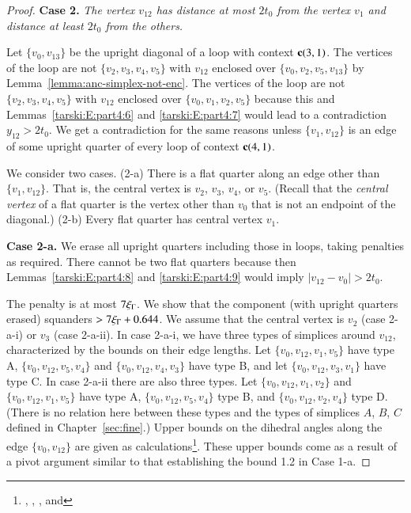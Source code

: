 \begin{proof}
\medskip

{\bf Case 2.} {\it The vertex $v_{12}$ has distance at most $2t_0$
from the vertex $v_1$ and distance at least $2t_0$ from the
others.}

Let $\{v_0,v_{13}\}$ be the upright diagonal of a loop with context ${\operatorname{\bf c}}{(3,1)}$.  The
vertices of the loop are not $\{v_2,v_3,v_4,v_5\}$ with $v_{12}$
enclosed over $\{v_0,v_2,v_5,v_{13}\}$ by
Lemma~\ref{lemma:anc-simplex-not-enc}. The vertices of the loop
are not $\{v_2,v_3,v_4,v_5\}$ with $v_{12}$ enclosed over
$\{v_0,v_1,v_2,v_5\}$ because this and Lemmas~\ref{tarski:E:part4:6}
and \ref{tarski:E:part4:7} would lead to a contradiction
$y_{12}>2t_0$. 
We get a contradiction for the same reasons
 unless $\{v_1,v_{12}\}$ is an edge of some
upright quarter of every loop of context ${\operatorname{\bf c}}{(4,1)}$.

We consider two cases.  (2-a) There is a flat quarter along an
edge other than $\{v_1,v_{12}\}$.  That is, the central vertex is
$v_2$, $v_3$, $v_4$, or $v_5$.  (Recall that the {\it central
vertex} of a flat quarter is the vertex other than $v_0$ that
is not an endpoint of the diagonal.) (2-b) Every flat quarter has
central vertex $v_1$.

{\bf Case 2-a.}  We erase all upright quarters including those in
loops, taking penalties as required. There cannot be two flat
quarters because then Lemmas~\ref{tarski:E:part4:8} and
\ref{tarski:E:part4:9} would imply $|v_{12}-v_0|>2t_0$.

The penalty is at most $7\xi_\Gamma$.  We show that the component (with
upright quarters erased) squanders $>7\xi_\Gamma+0.644$.  We assume that
the central vertex is $v_2$ (case 2-a-i) or $v_3$ (case 2-a-ii).
In case 2-a-i, we have three types of simplices around $v_{12}$,
characterized by the bounds on their edge lengths.  Let
$\{v_0,v_{12},v_1,v_5\}$ have type A, $\{v_0,v_{12},v_5,v_4\}$ and
$\{v_0,v_{12},v_4,v_3\}$ have type B, and let $\{v_0,v_{12},v_3,v_1\}$
have type C.  In case 2-a-ii there are also three types.  Let
$\{v_0,v_{12},v_1,v_2\}$ and $\{v_0,v_{12},v_1,v_5\}$ have type A,
$\{v_0,v_{12},v_5,v_4\}$ type B, and $\{v_0,v_{12},v_2,v_4\}$ type D.
(There is no relation here between these types and the types of
simplices $A$, $B$, $C$ defined in Chapter~\ref{sec:fine}.) Upper
bounds on the dihedral angles along the edge $\{v_0,v_{12}\}$ are
given as calculations\footnote{, ,
, and }. These upper bounds come
as a result of a pivot argument similar to that establishing the
bound 1.2 in Case 1-a.


\end{proof}
